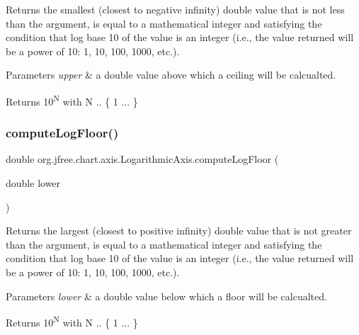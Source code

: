Returns the smallest (closest to negative infinity) double value that is not less than the argument, is equal to a mathematical integer and satisfying the condition that log base 10 of the value is an integer (i.\+e., the value returned will be a power of 10\+: 1, 10, 100, 1000, etc.).


\begin{DoxyParams}{Parameters}
{\em upper} & a double value above which a ceiling will be calcualted.\\
\hline
\end{DoxyParams}
\begin{DoxyReturn}{Returns}
10\textsuperscript{N} with N .. \{ 1 ... \} 
\end{DoxyReturn}
\mbox{\label{classorg_1_1jfree_1_1chart_1_1axis_1_1_logarithmic_axis_aae87e6e19a0eddb7b2b1e08234c05362}} 
\subsubsection{\texorpdfstring{compute\+Log\+Floor()}{computeLogFloor()}}
{\footnotesize\ttfamily double org.\+jfree.\+chart.\+axis.\+Logarithmic\+Axis.\+compute\+Log\+Floor (\begin{DoxyParamCaption}\item[{double}]{lower }\end{DoxyParamCaption})\hspace{0.3cm}{\ttfamily [protected]}}

Returns the largest (closest to positive infinity) double value that is not greater than the argument, is equal to a mathematical integer and satisfying the condition that log base 10 of the value is an integer (i.\+e., the value returned will be a power of 10\+: 1, 10, 100, 1000, etc.).


\begin{DoxyParams}{Parameters}
{\em lower} & a double value below which a floor will be calcualted.\\
\hline
\end{DoxyParams}
\begin{DoxyReturn}{Returns}
10\textsuperscript{N} with N .. \{ 1 ... \} 
\end{DoxyReturn}
\mbox{\label{classorg_1_1jfree_1_1chart_1_1axis_1_1_logarithmic_axis_acd01e34c2d8c6e5aed52fa37a00d5efd}} 
